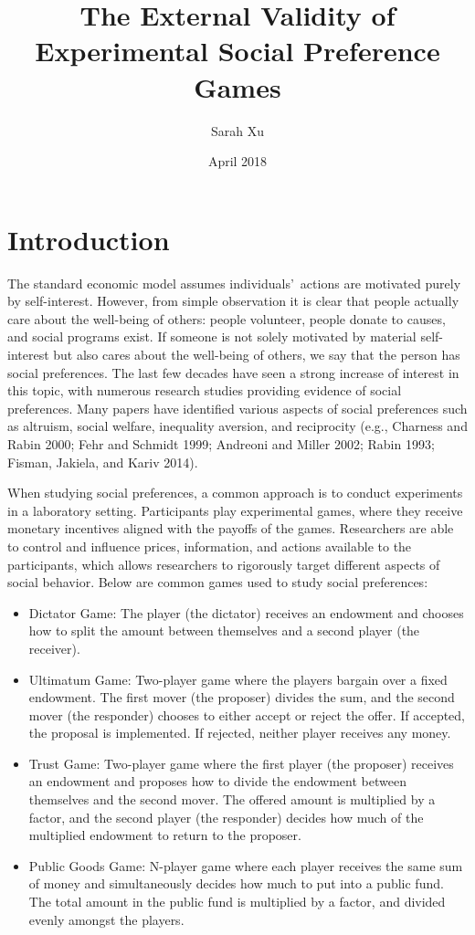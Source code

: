 \documentclass[12pt]{article}
\title{The External Validity of Experimental Social Preference Games}
\author{Sarah Xu}
\date{April 2018}
\begin{document}
\maketitle

\section{Introduction}

The standard economic model assumes individuals\rq \ actions are motivated purely by self-interest. However, from simple observation it is clear that people actually care about the well-being of others: people volunteer, people donate to causes, and social programs exist. If someone is not solely motivated by material self-interest but also cares about the well-being of others, we say that the person has social preferences. The last few decades have seen a strong increase of interest in this topic, with numerous research studies providing evidence of social preferences. Many papers have identified various aspects of social preferences such as altruism, social welfare, inequality aversion, and reciprocity (e.g., Charness and Rabin 2000; Fehr and Schmidt 1999; Andreoni and Miller 2002; Rabin 1993; Fisman, Jakiela, and Kariv 2014). 
 
When studying social preferences, a common approach is to conduct experiments in a laboratory setting. Participants play experimental games, where they receive monetary incentives aligned with the payoffs of the games. Researchers are able to control and influence prices, information, and actions available to the participants, which allows researchers to rigorously target different aspects of social behavior. Below are common games used to study social preferences: 

\begin{itemize}

\item{Dictator Game}: The player (the dictator) receives an endowment and chooses how to split the amount between themselves and a second player (the receiver).
\item{Ultimatum Game}: Two-player game where the players bargain over a fixed endowment. The first mover (the proposer) divides the sum, and the second mover (the responder) chooses to either accept or reject the offer. If accepted, the proposal is implemented. If rejected, neither player receives any money.
\item{Trust Game}: Two-player game where the first player (the proposer) receives an endowment and proposes how to divide the endowment between themselves and the second mover. The offered amount is multiplied by a factor, and the second player (the responder) decides how much of the multiplied endowment to return to the proposer. 
\item{Public Goods Game}: N-player game where each player receives the same sum of money and simultaneously decides how much to put into a public fund. The total amount in the public fund is multiplied by a factor, and divided evenly amongst the players. \end{itemize}
\end{document}
